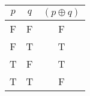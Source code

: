 \begin{tabular}{|c|c||c|}
\hline
$ p $ & $ q $ & $ (p \oplus q) $ \\
\hline
F & F & F \\
F & T & T \\
T & F & T \\
T & T & F \\
\hline
\end{tabular}

